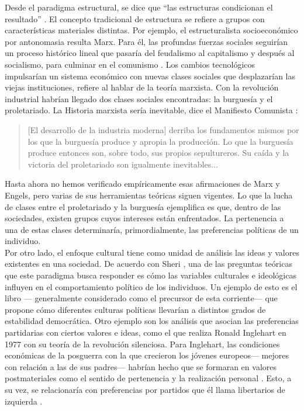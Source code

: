 Desde el paradigma estructural, se dice que ``las estructuras condicionan el resultado'' \parencite{BV08}. El concepto tradicional de estructura se refiere a grupos con características materiales distintas. Por ejemplo, el estructuralista socioeconómico por antonomasia resulta Marx. Para él, las profundas fuerzas sociales seguirían un proceso histórico lineal que pasaría del feudalismo al capitalismo y después al socialismo, para culminar en el comunismo \parencite{BV08}. Los cambios tecnológicos impulsarían un sistema económico con nuevas clases sociales que desplazarían las viejas instituciones, refiere \textcite{Heilbroner92} al hablar de la teoría marxista. Con la revolución industrial habrían llegado dos clases sociales encontradas: la burguesía y el proletariado. La Historia marxista sería inevitable, dice el Manifiesto Comunista \parencite{Heilbroner92}: 

\begin{quote}
[El desarrollo de la industria moderna] derriba los fundamentos mismos por los que la burguesía produce y apropia la producción. Lo que la burguesía produce entonces son, sobre todo, sus propios sepultureros. Su caída y la victoria del proletariado son igualmente inevitables...
\end{quote}

Hasta ahora no hemos verificado empíricamente esas afirmaciones de Marx y Engels, pero varias de sus herramientas teóricas siguen vigentes. Lo que la lucha de clases entre el proletariado y la burguesía ejemplifica es que, dentro de las sociedades, existen grupos cuyos intereses están enfrentados. La pertenencia a una de estas clases determinaría, primordialmente, las preferencias políticas de un individuo.\\

Por otro lado, el enfoque cultural tiene como unidad de análisis las ideas y valores existentes en una sociedad. 
De acuerdo con Sheri \textcite{Berman01}, una de las preguntas teóricas que este paradigma busca responder es cómo las variables culturales e ideológicas influyen en el comportamiento político de los individuos. Un ejemplo de esto es el libro  \parencite{AlmondVerba63}--- generalmente considerado como el precursor de esta corriente--- que propone cómo diferentes culturas políticas llevarían a distintos grados de estabilidad democrática. Otro ejemplo son los análisis que asocian las preferencias partidarias con ciertos valores e ideas, como el que realiza Ronald Inglehart en 1977 con su teoría de la revolución silenciosa. Para Inglehart, las condiciones económicas de la posguerra con la que crecieron los jóvenes europeos--- mejores con relación a las de sus padres--- habrían hecho que se formaran en valores postmateriales como el sentido de pertenencia y la realización personal \parencite{Kesselman79}. Esto, a su vez, se relacionaría con preferencias por partidos que él llama libertarios de izquierda \parencite{Inglehart16}.\\ 

